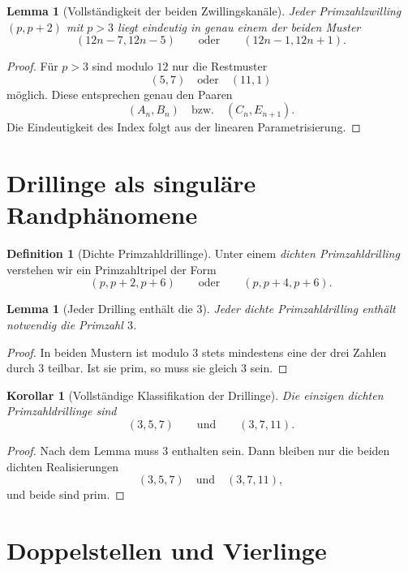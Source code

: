 \documentclass[11pt,a4paper]{article}
\newtheorem{lemma}[satz]{Lemma}
\newtheorem{korollar}[satz]{Korollar}
\theoremstyle{definition}
\newtheorem{definition}[satz]{Definition}
\theoremstyle{remark}
\begin{document}
	\begin{lemma}[Vollständigkeit der beiden Zwillingskanäle]
		Jeder Primzahlzwilling \((p,p+2)\) mit \(p>3\) liegt eindeutig in genau einem der beiden Muster
		\[
		(12n-7,12n-5)
		\qquad\text{oder}\qquad
		(12n-1,12n+1).
		\]
	\end{lemma}
	
	\begin{proof}
		Für \(p>3\) sind modulo \(12\) nur die Restmuster
		\[
		(5,7)\quad\text{oder}\quad(11,1)
		\]
		möglich. Diese entsprechen genau den Paaren
		\[
		(A_n,B_n)
		\quad\text{bzw.}\quad
		(C_n,E_{n+1}).
		\]
		Die Eindeutigkeit des Index folgt aus der linearen Parametrisierung.
	\end{proof}
	
	\section{Drillinge als singuläre Randphänomene}
	
	\begin{definition}[Dichte Primzahldrillinge]
		Unter einem \emph{dichten Primzahldrilling} verstehen wir ein Primzahltripel der Form
		\[
		(p,p+2,p+6)
		\qquad\text{oder}\qquad
		(p,p+4,p+6).
		\]
	\end{definition}
	
	\begin{lemma}[Jeder Drilling enthält die \(3\)]
		Jeder dichte Primzahldrilling enthält notwendig die Primzahl \(3\).
	\end{lemma}
	
	\begin{proof}
		In beiden Mustern ist modulo \(3\) stets mindestens eine der drei Zahlen durch \(3\) teilbar.
		Ist sie prim, so muss sie gleich \(3\) sein.
	\end{proof}
	
	\begin{korollar}[Vollständige Klassifikation der Drillinge]
		Die einzigen dichten Primzahldrillinge sind
		\[
		(3,5,7)
		\qquad\text{und}\qquad
		(3,7,11).
		\]
	\end{korollar}
	
	\begin{proof}
		Nach dem Lemma muss \(3\) enthalten sein. Dann bleiben nur die beiden dichten Realisierungen
		\[
		(3,5,7)\quad\text{und}\quad(3,7,11),
		\]
		und beide sind prim.
	\end{proof}
	
	\section{Doppelstellen und Vierlinge}
	
\end{document}

